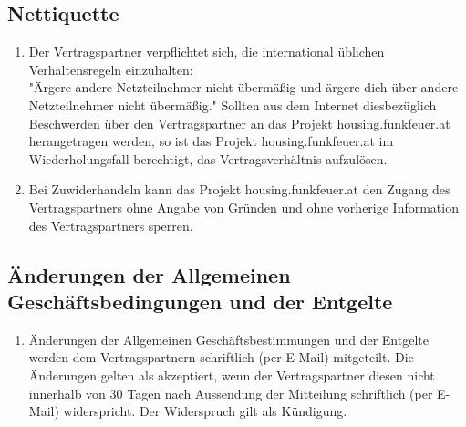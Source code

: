 \documentclass[parskip=half]{article}
\begin{document}
\subsection{Nettiquette}
\begin{enumerate}
\item Der Vertragspartner verpflichtet sich, die international üblichen Verhaltensregeln einzuhalten: \\
"Ärgere andere Netzteilnehmer nicht übermäßig und ärgere dich über andere
Netzteilnehmer nicht übermäßig." Sollten aus dem Internet diesbezüglich Beschwerden über
den Vertragspartner an das Projekt housing.funkfeuer.at herangetragen werden, so ist das Projekt
housing.funkfeuer.at im Wiederholungsfall berechtigt, das Vertragsverhältnis aufzulösen.
\item Bei Zuwiderhandeln kann das Projekt housing.funkfeuer.at den Zugang des
Vertragspartners ohne Angabe von Gründen und ohne vorherige Information des
Vertragspartners sperren.
\end{enumerate}

\subsection{ Änderungen der Allgemeinen Geschäftsbedingungen und der Entgelte}
\begin{enumerate}
\item[] Änderungen der Allgemeinen Geschäftsbestimmungen und der Entgelte werden dem
Vertragspartnern schriftlich (per E-Mail) mitgeteilt. Die Änderungen gelten als akzeptiert,
wenn der Vertragspartner diesen nicht innerhalb von 30 Tagen nach Aussendung der
Mitteilung schriftlich (per E-Mail) widerspricht. Der Widerspruch gilt als Kündigung.
\end{enumerate}
\end{document}
